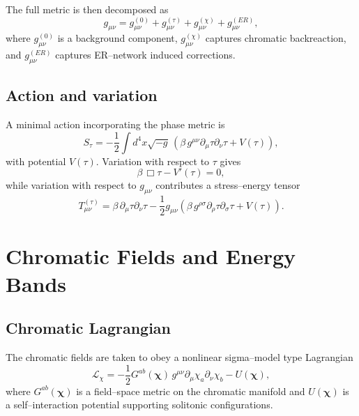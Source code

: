 \documentclass[11pt]{book}
\begin{document}
The full metric is then decomposed as
\begin{equation}
  g_{\mu\nu} = g^{(0)}_{\mu\nu} + g^{(\tau)}_{\mu\nu} + g^{(\chi)}_{\mu\nu} + g^{(ER)}_{\mu\nu},
\end{equation}
where $g^{(0)}_{\mu\nu}$ is a background component, $g^{(\chi)}_{\mu\nu}$ captures chromatic backreaction, and $g^{(ER)}_{\mu\nu}$ captures ER--network induced corrections.

\section{Action and variation}

A minimal action incorporating the phase metric is
\begin{equation}
  S_\tau = -\frac{1}{2} \int d^4x \sqrt{-g}\, \left( \beta\, g^{\mu\nu}\partial_\mu \tau \partial_\nu \tau + V(\tau) \right),
\end{equation}
with potential $V(\tau)$.
Variation with respect to $\tau$ gives
\begin{equation}
  \beta\, \Box \tau - V'(\tau) = 0,
\end{equation}
while variation with respect to $g_{\mu\nu}$ contributes a stress--energy tensor
\begin{equation}
  T^{(\tau)}_{\mu\nu}
  =
  \beta\, \partial_\mu \tau \partial_\nu \tau
  - \frac{1}{2} g_{\mu\nu}
  \left(
    \beta\, g^{\rho\sigma}\partial_\rho \tau \partial_\sigma \tau + V(\tau)
  \right).
\end{equation}

\chapter{Chromatic Fields and Energy Bands}

\section{Chromatic Lagrangian}

The chromatic fields are taken to obey a nonlinear sigma--model type Lagrangian
\begin{equation}
  \mathcal{L}_\chi
  =
  -\frac{1}{2} G^{ab}(\bm{\chi})\, g^{\mu\nu}\partial_\mu \chi_a \partial_\nu \chi_b
  - U(\bm{\chi}),
\end{equation}
where $G^{ab}(\bm{\chi})$ is a field--space metric on the chromatic manifold and $U(\bm{\chi})$ is a self--interaction potential supporting solitonic configurations.
\end{document}
